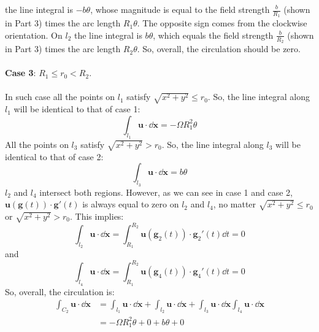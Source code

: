 \documentclass{article}
\begin{document}
\begin{enumerate}
\begin{enumerate}
      the line integral is \(-b\theta\), whose magnitude is equal to the field strength \(\frac{b}{R_1}\) (shown in Part 3) times the arc length
      \(R_1\theta\). The opposite sign comes from the clockwise orientation. On \(l_2\) the line integral is \(b\theta \),
      which equals the field strength \(\frac{b}{R_2}\) (shown in Part 3) times the arc length \(R_2\theta\). So, overall, the circulation should
      be zero.
      \\
      \\
      \textbf{Case 3}: \(R_1\le r_0 <R_2\). \\
      \\
      In such case all the points on \(l_1\) satisfy \(\sqrt{x^2+y^2}\le r_0\). So, the line integral along \(l_1\)
      will be identical to that of case 1:
      \begin{equation}
        \int_{l_1} \mathbf{u}\cdot \dd\mathbf{x} = -\Omega R_1^2\theta
      \end{equation}
      All the points on \(l_3\) satisfy \(\sqrt{x^2+y^2} > r_0\). So, the line integral along \(l_3\) will be identical to that of
      case 2:
      \begin{equation}
        \int_{l_3} \mathbf{u}\cdot \dd\mathbf{x} = b\theta
      \end{equation}
      \(l_2\) and \(l_4\) intersect both regions. However, as we can see in case 1 and case 2,
      \(\mathbf{u}(\mathbf{g}(t))\cdot \mathbf{g}'(t)\) is always equal to zero on \(l_2\) and \(l_4\),
      no matter \(\sqrt{x^2+y^2}\le r_0\) or \(\sqrt{x^2+y^2} > r_0\). This implies:
      \begin{equation}
        \int_{l_2} \mathbf{u}\cdot \dd\mathbf{x} = \int_{R_1}^{R_2} \mathbf{u}(\mathbf{g}_2(t))\cdot \mathbf{g}_2'(t) \dd t =0
      \end{equation}
      and
      \begin{equation}
        \int_{l_4} \mathbf{u}\cdot \dd\mathbf{x}= \int_{R_1}^{R_2} \mathbf{u}(\mathbf{g}_4(t))\cdot \mathbf{g}_4'(t) \dd t = 0
      \end{equation}
      So, overall, the circulation is:
      \begin{align*}
        \int_{C_2} \mathbf{u}\cdot \dd\mathbf{x}
        &= \int_{l_1} \mathbf{u}\cdot \dd\mathbf{x} +\int_{l_2} \mathbf{u}\cdot \dd\mathbf{x} +\int_{l_3} \mathbf{u}\cdot \dd\mathbf{x}
        \int_{l_4} \mathbf{u}\cdot \dd\mathbf{x}\\
        &= -\Omega R_1^2\theta + 0 + b \theta + 0 \\

\end{align*}
\end{enumerate}
\end{enumerate}
\end{document}

